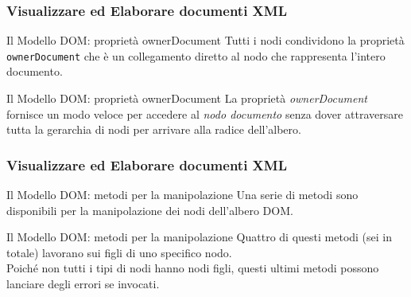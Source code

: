 \begin{frame}
    \frametitle{Visualizzare ed Elaborare documenti XML}
    \addtocounter{nframe}{1}
    

     \begin{block}{Il Modello DOM: proprietà ownerDocument}
        Tutti i nodi condividono la proprietà \texttt{ownerDocument} che è un collegamento diretto al nodo che rappresenta l'intero documento.
     \end{block}

     \begin{block}{Il Modello DOM: proprietà ownerDocument}
        La proprietà \textit{ownerDocument} fornisce un modo veloce per accedere al \textit{nodo documento} senza dover attraversare tutta la gerarchia di nodi per arrivare alla radice dell'albero.
     \end{block}

\end{frame}

\begin{frame}
    \frametitle{Visualizzare ed Elaborare documenti XML}
    \addtocounter{nframe}{1}
    

     \begin{block}{Il Modello DOM: metodi per la manipolazione}
        Una serie di metodi sono disponibili per la manipolazione dei nodi dell'albero DOM.
     \end{block}

     \begin{block}{Il Modello DOM: metodi per la manipolazione}
        Quattro di questi metodi (sei in totale) lavorano sui figli di uno specifico nodo.
        \\Poiché non tutti i tipi di nodi hanno nodi figli, questi ultimi metodi possono lanciare degli errori se invocati.
     \end{block}

\end{frame}


